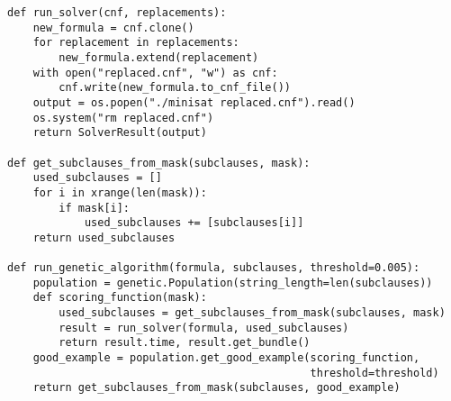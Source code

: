 \begin{minipage}{\textwidth+2cm}
  \begin{lstlisting}
def run_solver(cnf, replacements):
    new_formula = cnf.clone()
    for replacement in replacements:
        new_formula.extend(replacement)
    with open("replaced.cnf", "w") as cnf:
        cnf.write(new_formula.to_cnf_file())
    output = os.popen("./minisat replaced.cnf").read()
    os.system("rm replaced.cnf")
    return SolverResult(output)

def get_subclauses_from_mask(subclauses, mask):
    used_subclauses = []
    for i in xrange(len(mask)):
        if mask[i]:
            used_subclauses += [subclauses[i]]
    return used_subclauses

def run_genetic_algorithm(formula, subclauses, threshold=0.005):
    population = genetic.Population(string_length=len(subclauses))
    def scoring_function(mask):
        used_subclauses = get_subclauses_from_mask(subclauses, mask)
        result = run_solver(formula, used_subclauses)
        return result.time, result.get_bundle()
    good_example = population.get_good_example(scoring_function,
                                               threshold=threshold)
    return get_subclauses_from_mask(subclauses, good_example)
  \end{lstlisting}
\end{minipage}%
